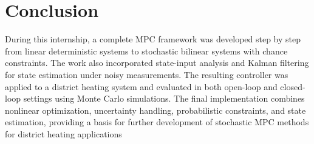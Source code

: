 \chapter{Conclusion}
During this internship, a complete MPC framework was developed step by step from linear deterministic systems to stochastic bilinear systems with chance constraints. The work also incorporated state-input analysis and Kalman filtering for state estimation under noisy measurements. The resulting controller was applied to a district heating system and evaluated in both open-loop and closed-loop settings using Monte Carlo simulations. The final implementation combines nonlinear optimization, uncertainty handling, probabilistic constraints, and state estimation, providing a basis for further development of stochastic MPC methods for district heating applications